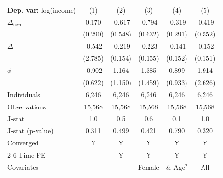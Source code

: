 \begin{tabular}{l ccccc} \toprule  \textbf{Dep. var:}  log(income) 
                    &\multicolumn{1}{c}{(1)}   &\multicolumn{1}{c}{(2)}   &\multicolumn{1}{c}{(3)}   &\multicolumn{1}{c}{(4)}   &\multicolumn{1}{c}{(5)}   \\

\addlinespace
$\Delta_{\text{never}}$&       0.170   &      -0.617   &      -0.794   &      -0.319   &      -0.419   \\
                    &     (0.290)   &     (0.548)   &     (0.632)   &     (0.291)   &     (0.552)   \\

\addlinespace
$\bar{\Delta}$      &      -0.542   &      -0.219   &      -0.223   &      -0.141   &      -0.152   \\
                    &     (2.785)   &     (0.154)   &     (0.155)   &     (0.152)   &     (0.151)   \\

\addlinespace
$\phi$              &      -0.902   &       1.164   &       1.385   &       0.899   &       1.914   \\
                    &     (0.622)   &     (1.150)   &     (1.459)   &     (0.933)   &     (2.626)   \\
\addlinespace
Individuals         &       6,246   &       6,246   &       6,246   &       6,246   &       6,246   \\
Observations        &      15,568   &      15,568   &      15,568   &      15,568   &      15,568   \\
J-stat              &         1.0   &         0.5   &         0.6   &         0.1   &         1.0   \\
J-stat (p-value)    &       0.311   &       0.499   &       0.421   &       0.790   &       0.320   \\
Converged           &           Y   &           Y   &           Y   &           Y   &           Y   \\
\cmidrule{2-6} Time FE & & Y & Y & Y & Y \\ Covariates & & & Female & \& Age$^2$ & All \\ \bottomrule \end{tabular}

